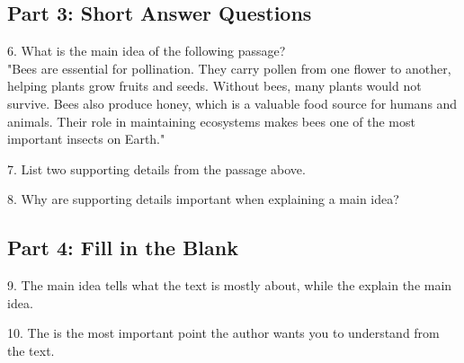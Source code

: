 \documentclass[12pt]{article}
\begin{document}
\vspace{1cm}

\subsection*{Part 3: Short Answer Questions}

6. What is the main idea of the following passage?\\
"Bees are essential for pollination. They carry pollen from one flower to another, helping plants grow fruits and seeds. Without bees, many plants would not survive. Bees also produce honey, which is a valuable food source for humans and animals. Their role in maintaining ecosystems makes bees one of the most important insects on Earth."

\vspace{3cm}

7. List two supporting details from the passage above.

\vspace{3cm}

8. Why are supporting details important when explaining a main idea?

\vspace{3cm}

\subsection*{Part 4: Fill in the Blank}

9. The main idea tells what the text is mostly about, while the \underline{\hspace{4cm}} explain the main idea.

\vspace{3cm}

10. The \underline{\hspace{4cm}} is the most important point the author wants you to understand from the text.



\end{document}

